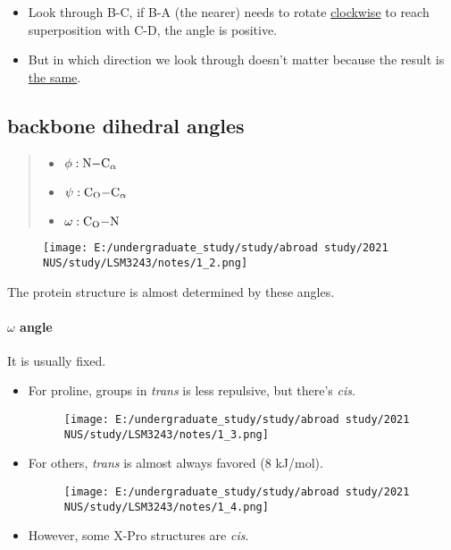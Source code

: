 \begin{itemize}
	\item
	Look through B-C, if B-A (the nearer) needs to rotate
	\underline{clockwise} to reach superposition with C-D, the angle is
	positive.
	\item
	But in which direction we look through doesn't matter because the
	result is \underline{the same}.
\end{itemize}

\hypertarget{backbone-dihedral-angles}{%
	\subsection{backbone dihedral angles}\label{backbone-dihedral-angles}}

\begin{quote}
	\begin{itemize}
		\item
		\(\phi : \ce{N-C_{\alpha}}\)
		\item
		\(\psi : \ce{C_O-C_{\alpha}}\)
		\item
		\(\omega : \ce{C_O-N}\)
	\end{itemize}
\end{quote}

\begin{figure}
	\centering
	\texttt{[image: E:/undergraduate\_study/study/abroad study/2021 NUS/study/LSM3243/notes/1\_2.png]}
\end{figure}

The protein structure is almost determined by these angles.

\hypertarget{angle}{%
	\paragraph{\texorpdfstring{\(\omega\)
			angle}{\textbackslash{}omega angle}}\label{angle}}

It is usually fixed.

\begin{itemize}
	\item
	For proline, groups in \emph{trans} is less repulsive, but there's
	\emph{cis}.
	
	\begin{figure}
		\centering
		\texttt{[image: E:/undergraduate\_study/study/abroad study/2021 NUS/study/LSM3243/notes/1\_3.png]}
	\end{figure}
	\item
	For others, \emph{trans} is almost always favored (8 kJ/mol).
	
	\begin{figure}
		\centering
		\texttt{[image: E:/undergraduate\_study/study/abroad study/2021 NUS/study/LSM3243/notes/1\_4.png]}
	\end{figure}
	\item
	However, some X-Pro structures are \emph{cis}.
\end{itemize}

